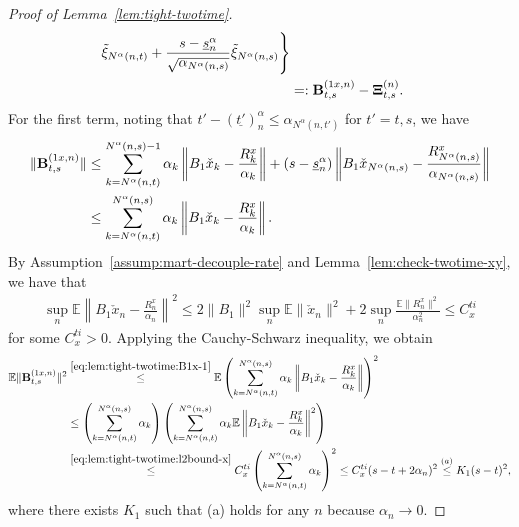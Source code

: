 \documentclass[11pt]{article}
\theoremstyle{plain}
\theoremstyle{definition}
\def\cti{C^{ti}}
\def\eps{{\varepsilon}}
\def\EB{{\mathbb E}}
\newcommand{\xcheck}{{\check{x}}}
\newcommand{\ssum}[3]{\sum\limits_{{#1}={#2}}^{#3}}
\def\Xii{\mbox{\boldmath$\Xi$\unboldmath}}
\def\bfB{{\bf B}}
\begin{document}
\begin{appendix}
\begin{proof}[Proof of Lemma~\ref{lem:tight-twotime}]
\begin{align*}
    \tilde{\xi}_{N^\alpha(n,t)} 
    + \frac{s - \underline{s}^\alpha_{n}}{ \sqrt{ \alpha_{N^\alpha(n,s)} } } 
    \tilde{\xi}_{N^\alpha(n,s)} \Bigg\} \\
    & =: \bfB^{(1x,n)}_{t,s} - \Xii^{(n)}_{t,s}.
\end{align*}
For the first term, 
noting that $t' - (\underline{t'})^\alpha_{n} \le \alpha_{N^\alpha(n,t')}$ for $t'=t,s$,
we have
\begin{align}
    \| \bfB^{(1x,n)}_{t,s} \| & \le \ssum{k}{N^\alpha(n,t)}{N^\alpha(n,s) - 1} \alpha_{k} \left\| B_1 \xcheck_{k} - \frac{R_{k}^x}{\alpha_{k}} \right\| + (s - \underline{s}^\alpha_{n}) \left\| B_1 \xcheck_{N^\alpha(n,s)} - \frac{ R_{N^\alpha(n,s)}^x }{ \alpha_{N^\alpha(n,s)} } \right\| \nonumber \\
    & \le \ssum{k}{N^\alpha(n,t)}{N^\alpha(n,s)} \alpha_{k} \left\| B_1 \xcheck_{k} - \frac{R_{k}^x}{\alpha_{k}} \right\|. \label{eq:lem:tight-twotime:B1x-1}
\end{align}
By Assumption~\ref{assump:mart-decouple-rate} and Lemma~\ref{lem:check-twotime-xy}, we have that 
\begin{align}
    \label{eq:lem:tight-twotime:l2bound-x}
    \sup_{n} \EB \left\| B_1 \xcheck_{n} - \frac{R_{n}^x }{ \alpha_{n}} \right\|^2 \le 2 \| B_1 \|^2 \sup_{n} \EB \| \xcheck_{n} \|^2 + 2 \sup_{n} \frac{ \EB \| R_{n}^x \|^2}{\alpha_{n}^2} \le \cti_x
\end{align}
for some $\cti_x > 0$. 
Applying the Cauchy-Schwarz inequality, we obtain
\begin{align}
    \EB \| \bfB^{(1x,n)}_{t,s} \|^2
    & \overset{\eqref{eq:lem:tight-twotime:B1x-1}}{\le}
    \EB \left( \ssum{k}{N^\alpha(n,t)}{N^\alpha(n,s)} \alpha_{k} \left\| B_1 \xcheck_{k} - \frac{R_{k}^x}{\alpha_{k}} \right\|\right)^2 \nonumber \\
    & \le \left( \ssum{k}{N^\alpha(n,t)}{N^\alpha(n,s)} \alpha_{k} \right) \left( \ssum{k}{N^\alpha(n,t)}{N^\alpha(n,s)} \alpha_{k} \EB  \left\| B_1 \xcheck_{k} - \frac{R_{k}^x}{\alpha_{k}} \right\|^2 \right) \nonumber \\
    & \overset{ \eqref{eq:lem:tight-twotime:l2bound-x} }{\le} \cti_x \left( \ssum{k}{N^\alpha(n,t)}{N^\alpha(n,s)} \alpha_{k} \right)^2 
    \le  \cti_x ( s-t + 2 \alpha_{n} )^2
    \overset{(a)}{\le} K_1(s-t)^2,
    \label{eq:lem:tight-twotime:B1x}
\end{align}
where there exists $K_1$ such that (a) holds for any $n$ because $\alpha_{n} \to 0$.


\end{proof}
\end{appendix}
\end{document}

